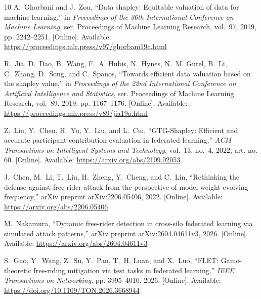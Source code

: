 \documentclass[journal]{IEEEtran}
\begin{document}
\begin{thebibliography}{10}
\BIBentryALTinterwordspacing
A.~Ghorbani and J.~Zou, ``Data shapley: Equitable valuation of data for machine
  learning,'' in \emph{Proceedings of the 36th International Conference on
  Machine Learning}, ser. Proceedings of Machine Learning Research, vol.~97,
  2019, pp. 2242--2251. [Online]. Available:
  \url{https://proceedings.mlr.press/v97/ghorbani19c.html}
\BIBentrySTDinterwordspacing

\BIBentryALTinterwordspacing
R.~Jia, D.~Dao, B.~Wang, F.~A. Hubis, N.~Hynes, N.~M. Gurel, B.~Li, C.~Zhang,
  D.~Song, and C.~Spanos, ``Towards efficient data valuation based on the
  shapley value,'' in \emph{Proceedings of the 22nd International Conference on
  Artificial Intelligence and Statistics}, ser. Proceedings of Machine Learning
  Research, vol.~89, 2019, pp. 1167--1176. [Online]. Available:
  \url{https://proceedings.mlr.press/v89/jia19a.html}
\BIBentrySTDinterwordspacing

\BIBentryALTinterwordspacing
Z.~Liu, Y.~Chen, H.~Yu, Y.~Liu, and L.~Cui, ``{GTG-Shapley}: Efficient and
  accurate participant contribution evaluation in federated learning,''
  \emph{ACM Transactions on Intelligent Systems and Technology}, vol.~13,
  no.~4, 2022, art. no. 60. [Online]. Available:
  \url{https://arxiv.org/abs/2109.02053}
\BIBentrySTDinterwordspacing

\BIBentryALTinterwordspacing
J.~Chen, M.~Li, T.~Liu, H.~Zheng, Y.~Cheng, and C.~Lin, ``Rethinking the
  defense against free-rider attack from the perspective of model weight
  evolving frequency,'' arXiv preprint arXiv:2206.05406, 2022. [Online].
  Available: \url{https://arxiv.org/abs/2206.05406}
\BIBentrySTDinterwordspacing

\BIBentryALTinterwordspacing
M.~Nakamura, ``Dynamic free-rider detection in cross-silo federated learning
  via simulated attack patterns,'' arXiv preprint arXiv:2604.04611v3, 2026.
  [Online]. Available: \url{https://arxiv.org/abs/2604.04611v3}
\BIBentrySTDinterwordspacing

\BIBentryALTinterwordspacing
S.~Guo, Y.~Wang, Z.~Su, Y.~Pan, T.~H. Luan, and X.~Luo, ``{FLET}:
  Game-theoretic free-riding mitigation via test tasks in federated learning,''
  \emph{IEEE Transactions on Networking}, pp. 3995--4010, 2026. [Online].
  Available: \url{https://doi.org/10.1109/TON.2026.3668944}
\BIBentrySTDinterwordspacing


\end{thebibliography}
\end{document}
